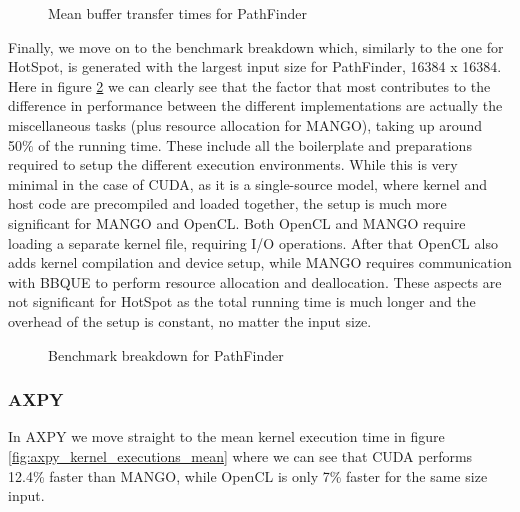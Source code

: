 \begin{figure}%
    \centering
    \qquad
    \captionsetup{justification=centering}
    \caption{Mean buffer transfer times for PathFinder}%
    \label{fig:pathfinder_buffer_transfers_mean}%
\end{figure}

Finally, we move on to the benchmark breakdown which, similarly to the one for HotSpot, is generated with the largest input size for PathFinder, 16384 x 16384. Here in figure \ref{fig:pathfinder_breakdown} we can clearly see that the factor that most contributes to the difference in performance between the different implementations are actually the miscellaneous tasks (plus resource allocation for MANGO), taking up around 50\% of the running time. These include all the boilerplate and preparations required to setup the different execution environments. While this is very minimal in the case of CUDA, as it is a single-source model, where kernel and host code are precompiled and loaded together, the setup is much more significant for MANGO and OpenCL. Both OpenCL and MANGO require loading a separate kernel file, requiring I/O operations. After that OpenCL also adds kernel compilation and device setup, while MANGO requires communication with BBQUE to perform resource allocation and deallocation. These aspects are not significant for HotSpot as the total running time is much longer and the overhead of the setup is constant, no matter the input size.

\begin{figure}
    \centering
    \resizebox{!}{160pt}{
        
    }
    \captionsetup{justification=centering}
    \caption{Benchmark breakdown for PathFinder}
    \label{fig:pathfinder_breakdown}
\end{figure}

\subsubsection{AXPY}

In AXPY we move straight to the mean kernel execution time in figure \ref{fig:axpy_kernel_executions_mean} where we can see that CUDA performs 12.4\% faster than MANGO, while OpenCL is only 7\% faster for the same size input.

